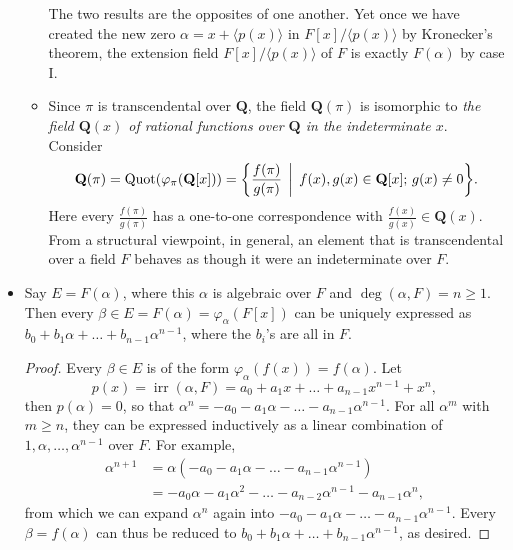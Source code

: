 \documentclass[11pt]{article}
\newcommand{\Q}{\mathbf{Q}}
\newcommand{\df}[1]{\textit{\textsf{#1}}}
\newcommand{\la}{\langle}
\newcommand{\ra}{\rangle}
\newcommand{\Quot}{\operatorname{Quot}} %
\newcommand{\irr}{\operatorname{irr}}
\renewcommand{\phi}{\varphi}
\begin{document}
\begin{itemize}
\begin{itemize}
        The two results are the opposites of one another. Yet once we have created the new zero $\alpha = x + \la p(x) \ra$ in $F[x]/\la p(x) \ra$ by Kronecker's theorem, the extension field $F[x]/\la p(x) \ra$ of $F$ is exactly $F(\alpha)$ by case I. %
        \item Since $\pi$ is transcendental over $\Q$, the field $\Q(\pi)$ is isomorphic to \df{the field $\Q(x)$ of rational functions over $\Q$ in the indeterminate $x$}. Consider \[\Q(\pi) = \Quot(\phi_\pi(\Q[x])) = \biggl\{\frac{f(\pi)}{g(\pi)} \,\biggm|\, f(x),g(x) \in \Q[x];\, g(x) \neq 0 \biggr\}.\] Here every $\frac{f(\pi)}{g(\pi)}$ has a one-to-one correspondence with $\frac{f(x)}{g(x)} \in \Q(x)$. From a structural viewpoint, in general, an element that is transcendental over a field $F$ behaves as though it were an indeterminate over $F$.
    \end{itemize}
    \item Say $E = F(\alpha)$, where this $\alpha$ is algebraic over $F$ and $\deg(\alpha,F) = n \geq 1$. Then every $\beta \in E = F(\alpha) = \phi_\alpha(F[x])$ can be uniquely expressed as $b_0 + b_1 \alpha + \dots + b_{n-1} \alpha^{n-1}$, where the $b_i$'s are all in $F$.
    \begin{proof}
        Every $\beta \in E$ is of the form $\phi_\alpha(f(x)) = f(\alpha)$. Let \[p(x) = \irr(\alpha,F) = a_0+a_1x+\dots+a_{n-1}x^{n-1}+x^n,\] then $p(\alpha) = 0$, so that $\alpha^n = -a_0-a_1 \alpha-\dots -a_{n-1} \alpha^{n-1}$. For all $\alpha^m$ with $m \geq n$, they can be expressed inductively as a  linear combination of $1,\alpha,\dots,\alpha^{n-1}$ over $F$. For example,
        \begin{align*}
            \alpha^{n+1} & = \alpha (-a_0-a_1 \alpha-\dots -a_{n-1} \alpha^{n-1}) \\ & = -a_0 \alpha - a_1 \alpha^2 - \dots - a_{n-2} \alpha^{n-1} - a_{n-1} \alpha^n,
        \end{align*}
        from which we can expand $\alpha^n$ again into $-a_0-a_1 \alpha-\dots -a_{n-1} \alpha^{n-1}$. Every $\beta = f(\alpha)$ can thus be reduced to $b_0 + b_1 \alpha + \dots + b_{n-1} \alpha^{n-1}$, as desired.
        

\end{proof}
\end{itemize}
\end{document}
